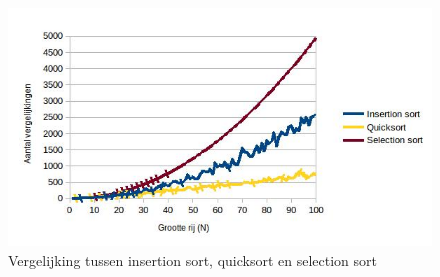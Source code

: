\documentclass{article}
\begin{document}
\begin{figure}[h!]
\centering
\includegraphics[scale=0.55]{vergelijking.jpg}
\caption{Vergelijking tussen insertion sort, quicksort en selection sort}
\label{fig:Vergelijking}
\end{figure}
\end{document}
